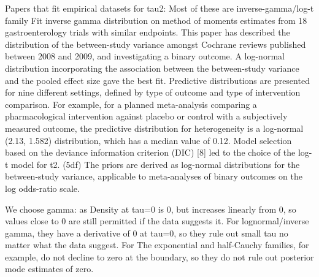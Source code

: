 Papers that fit empirical datasets for tau2: Most of these are inverse-gamma/log-t family
Fit inverse gamma distribution on method of moments estimates from 18 gastroenterology trials with similar endpoints.
This paper has described the distribution of the between-study variance amongst Cochrane reviews published between 2008 and 2009, and investigating a binary outcome. A log-normal distribution incorporating the association between the between-study variance and the pooled effect size gave the best fit.
Predictive distributions are presented for nine different settings, defined by type of outcome and type of intervention comparison. For example, for a planned meta-analysis comparing a pharmacological intervention against placebo or control with a subjectively measured outcome, the predictive distribution for heterogeneity is a log-normal (2.13, 1.582) distribution, which has a median value of 0.12.
Model selection based on the deviance information criterion (DIC) [8] led to the choice of the log-t model for t2. (5df)
The priors are derived as log-normal distributions for the between-study variance, applicable to meta-analyses of binary outcomes on the log odds-ratio scale.
%

We choose gamma: as Density at tau=0 is 0, but increases linearly from 0, so values close to 0 are still permitted if the data suggests it.
For lognormal/inverse gamma, they have a derivative of 0 at tau=0, so they rule out small tau no matter what the data suggest.
For The exponential and half-Cauchy families, for example, do not decline to zero at the boundary, so they do not rule out posterior mode estimates of zero.

